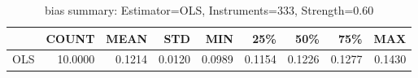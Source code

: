 \begin{table}[ht]
\centering
\caption{bias summary: Estimator=OLS, Instruments=333, Strength=0.60}
\begin{tabular}{lrrrrrrrr}
\toprule
 & COUNT & MEAN & STD & MIN & 25\% & 50\% & 75\% & MAX \\
\midrule
OLS & 10.0000 & 0.1214 & 0.0120 & 0.0989 & 0.1154 & 0.1226 & 0.1277 & 0.1430 \\
\bottomrule
\end{tabular}
\end{table}
